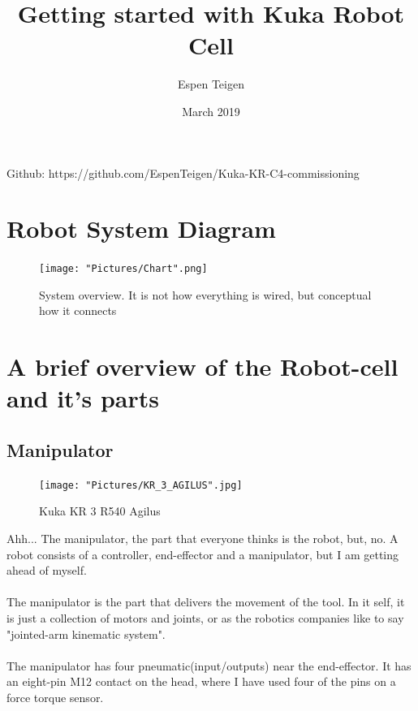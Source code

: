 \documentclass{article}
\title{Getting started with Kuka Robot Cell}
\author{Espen Teigen}
\date{March 2019}
\begin{document}
\maketitle

    Github: https://github.com/EspenTeigen/Kuka-KR-C4-commissioning

\newpage
\tableofcontents{}
\newpage


\section{Robot System Diagram}
    \begin{figure}[!h]
        \centering
        \texttt{[image: "Pictures/Chart".png]}
        \caption{System overview. It is not how everything is wired, but conceptual how it connects}
    \end{figure}

\newpage
\section{A brief overview of the Robot-cell and it's parts}
    \subsection{Manipulator}
    
     \begin{figure}[!h]
        \centering
        \texttt{[image: "Pictures/KR\_3\_AGILUS".jpg]}
        \caption{Kuka KR 3 R540 Agilus}
    \end{figure}
    
    
    Ahh... The manipulator, the part that everyone thinks is the robot, but, no. A robot consists of a controller, end-effector and a manipulator, but I am getting ahead of myself.
    \\\\
    The manipulator is the part that delivers the movement of the tool. In it self, it is just a collection of motors and joints, or as the robotics companies like to say "jointed-arm kinematic system". 
    \\\\
    The manipulator has four pneumatic(input/outputs) near the end-effector. It has an eight-pin M12 contact on the head, where I have used four of the pins on a force torque sensor.  
    
\end{document}
